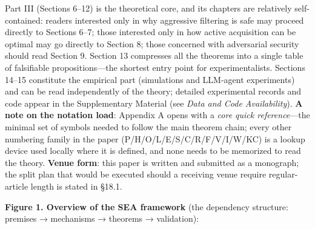 \documentclass[
  11pt]{article}
\begin{document}
Part III (Sections 6--12) is the theoretical core, and its chapters are
relatively self-contained: readers interested only in why aggressive
filtering is safe may proceed directly to Sections 6--7; those
interested only in how active acquisition can be optimal may go directly
to Section 8; those concerned with adversarial security should read
Section 9. Section 13 compresses all the theorems into a single table of
falsifiable propositions---the shortest entry point for
experimentalists. Sections 14--15 constitute the empirical part
(simulations and LLM-agent experiments) and can be read independently of
the theory; detailed experimental records and code appear in the
Supplementary Material (see \emph{Data and Code Availability}).
\textbf{A note on the notation load}: Appendix A opens with a \emph{core
quick reference}---the minimal set of symbols needed to follow the main
theorem chain; every other numbering family in the paper
(P/H/O/L/E/S/C/R/F/V/I/W/KC) is a lookup device used locally where it is
defined, and none needs to be memorized to read the theory.
\textbf{Venue form}: this paper is written and submitted as a monograph;
the split plan that would be executed should a receiving venue require
regular-article length is stated in §18.1.

\textbf{Figure 1. Overview of the SEA framework} (the dependency
structure: premises → mechanisms → theorems → validation):
\end{document}
